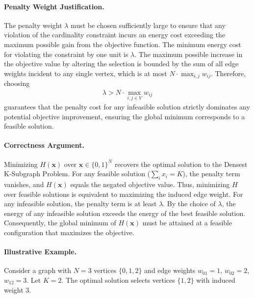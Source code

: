 \documentclass[12pt]{article}
\begin{document}
\paragraph{Penalty Weight Justification.}
The penalty weight $\lambda$ must be chosen sufficiently large to ensure that any violation of the cardinality constraint incurs an energy cost exceeding the maximum possible gain from the objective function. The minimum energy cost for violating the constraint by one unit is $\lambda$. The maximum possible increase in the objective value by altering the selection is bounded by the sum of all edge weights incident to any single vertex, which is at most $N \cdot \max_{i,j} w_{ij}$. Therefore, choosing
\begin{align}
    \lambda > N \cdot \max_{i, j \in V} w_{ij}
\end{align}
guarantees that the penalty cost for any infeasible solution strictly dominates any potential objective improvement, ensuring the global minimum corresponds to a feasible solution.

\paragraph{Correctness Argument.}
Minimizing $H(\mathbf{x})$ over $\mathbf{x} \in \{0, 1\}^N$ recovers the optimal solution to the Densest K-Subgraph Problem. For any feasible solution ($\sum_i x_i = K$), the penalty term vanishes, and $H(\mathbf{x})$ equals the negated objective value. Thus, minimizing $H$ over feasible solutions is equivalent to maximizing the induced edge weight. For any infeasible solution, the penalty term is at least $\lambda$. By the choice of $\lambda$, the energy of any infeasible solution exceeds the energy of the best feasible solution. Consequently, the global minimum of $H(\mathbf{x})$ must be attained at a feasible configuration that maximizes the objective.

\paragraph{Illustrative Example.}
Consider a graph with $N=3$ vertices $\{0, 1, 2\}$ and edge weights $w_{01} = 1$, $w_{02} = 2$, $w_{12} = 3$. Let $K=2$. The optimal solution selects vertices $\{1, 2\}$ with induced weight $3$.
\end{document}
